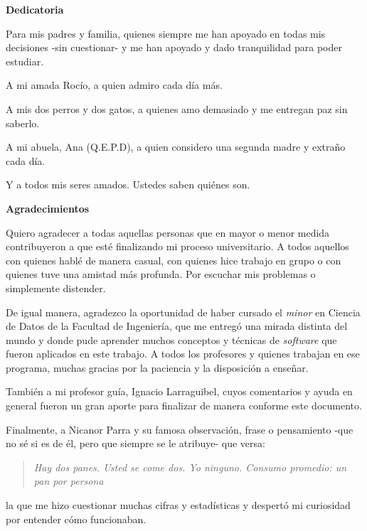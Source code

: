 \documentclass[
  12pt,
  letterpaper,
]{article}
\author{}
\date{\vspace{-2.5em}}
\begin{document}

\newpage

\newpage
\clearpage
\newpage

\noindent\textbf{\Large Dedicatoria}

Para mis padres y familia, quienes siempre me han apoyado en todas mis decisiones -sin cuestionar- y me han apoyado y dado tranquilidad para poder estudiar.

A mi amada Rocío, a quien admiro cada día más.

A mis dos perros y dos gatos, a quienes amo demasiado y me entregan paz sin saberlo.

A mi abuela, Ana (Q.E.P.D), a quien considero una segunda madre y extraño cada día.

Y a todos mis seres amados.
Ustedes saben quiénes son.

\clearpage
\newpage

\noindent\textbf{\Large Agradecimientos}

Quiero agradecer a todas aquellas personas que en mayor o menor medida contribuyeron a que esté finalizando mi proceso universitario.
A todos aquellos con quienes hablé de manera casual, con quienes hice trabajo en grupo o con quienes tuve una amistad más profunda.
Por escuchar mis problemas o simplemente distender.

De igual manera, agradezco la oportunidad de haber cursado el \emph{minor} en Ciencia de Datos de la Facultad de Ingeniería, que me entregó una mirada distinta del mundo y donde pude aprender muchos conceptos y técnicas de \emph{software} que fueron aplicados en este trabajo.
A todos los profesores y quienes trabajan en ese programa, muchas gracias por la paciencia y la disposición a enseñar.

También a mi profesor guía, Ignacio Larraguibel, cuyos comentarios y ayuda en general fueron un gran aporte para finalizar de manera conforme este documento.

Finalmente, a Nicanor Parra y su famosa observación, frase o pensamiento -que no sé si es de él, pero que siempre se le atribuye- que versa:

\begin{quote}
\emph{Hay dos panes. Usted se come dos. Yo ninguno. Consumo promedio: un pan por persona}
\end{quote}

la que me hizo cuestionar muchas cifras y estadísticas y despertó mi curiosidad por entender cómo funcionaban.

\clearpage
\newpage
\tableofcontents
\clearpage
\newpage
\listoftables
\clearpage
\newpage
\listoffigures
\clearpage
\newpage
\end{document}
